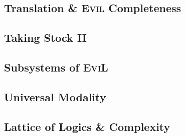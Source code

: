 \subsection{Translation \& \textsc{Evil} Completeness}
\label{translation}

% 

\subsection{Taking Stock II}\label{taking-stockII}


\subsection{Subsystems of \textsc{EviL}}\label{subsystems}


\subsection{Universal Modality}\label{supersystems}


\subsection{Lattice of Logics \& Complexity}\label{lattice}\label{conservative-extension}





